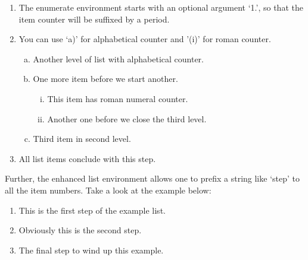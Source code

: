 \documentclass[a4paper,12pt]{article}
\begin{document}
	\begin{vquote}
	 \begin{enumerate}[1.]
	 \item The enumerate environment starts with an optional
	   argument `1.', so that the item counter will be suffixed
	   by a period.
	 \item You can use `a)' for alphabetical counter and '(i)' for
	   roman counter.
	  \begin{enumerate}[a)]
	    \item Another level of list with alphabetical counter.
	    \item One more item before we start another.
	    \begin{enumerate}[(i)]
	     \item This item has roman numeral counter.
	     \item Another one before we close the third level.
	    \end{enumerate}
	    \item Third item in second level.
	  \end{enumerate}
	 \item All list items conclude with this step.
	 \end{enumerate}
	\end{vquote}
	
	\vspace*{12pt}
	\def\rulecolor{blue!70}
	\def\rulecolor{orange}
	
	
	Further, the enhanced list environment allows one to prefix a
	string like `step' to all the item numbers.  Take a look at the
	example below:
	
	\begin{vquote}
	 \begin{enumerate}[Step 1.]
	  \item This is the first step of the example list.
	  \item Obviously this is the second step.
	  \item The final step to wind up this example.
	 \end{enumerate}
	\end{vquote}
	
	\def\rulecolor{blue!70}
	\def\rulecolor{orange}
	
	\vspace*{-18pt}
	
\end{document}
